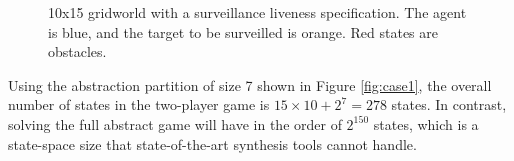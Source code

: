 \begin{figure}
\hfill
{}

\caption{10x15 gridworld with a surveillance liveness specification. The agent is blue, and the target to be surveilled is orange. Red states are obstacles.}
\label{fig:casestudies}

\end{figure}



Using the abstraction partition of size 7 shown in Figure \ref{fig:case1}, the overall number of states in the two-player game is $15\times10 + 2^7 = 278$ states. In contrast, solving the full abstract game will have in the order of $2^{150}$ states, which is a state-space size that state-of-the-art synthesis tools cannot handle. 

